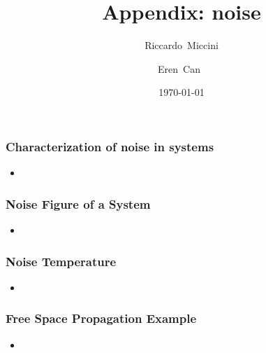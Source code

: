 \documentclass{beamer}
\title{Appendix: noise}
\subtitle{}
\author[Riccardo \and Eren]{Riccardo~Miccini\inst{1} \and Eren~Can~\inst{1}}
\institute[DTU]
{
	\inst{1}
	Technical University of Denmark\\
	Digital Communication
}
\date{\today}
\begin{document}
\frame{\titlepage}

\begin{frame}
	\frametitle{Characterization of noise in systems}
	\begin{itemize}
		\item
	\end{itemize}
\end{frame}


\begin{frame}
	\frametitle{Noise Figure of a System}
	\begin{itemize}
		\item 
	\end{itemize}
\end{frame}


\begin{frame}
	\frametitle{Noise Temperature}
	\begin{itemize}
		\item
	\end{itemize}
\end{frame}


\begin{frame}
	\frametitle{Free Space Propagation Example}
	\begin{itemize}
		\item
	\end{itemize}
\end{frame}
\end{document}
